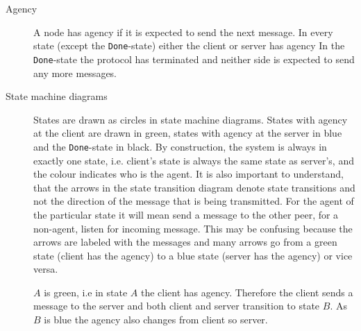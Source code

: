 \documentclass{report}
\newcommand{\state}[1]{\texttt{#1}}
\newcommand{\Done}{\state{Done}}
\theoremstyle{definition}{
  \newtheorem{lemma}{Lemma}[section] %
  \newtheorem{definition}[lemma]{Definition}
}
\theoremstyle{theorem}{
  \newtheorem{invariant}[lemma]{Invariant}
  \newtheorem{proofobligation}[lemma]{Proof Obligation}
}
\numberwithin{equation}{lemma}
\begin{document}
\begin{description}
\item[Agency]
  A node has agency if it is expected to send the next message.
  In every state (except the \Done-state) either the client or server has agency
  In the \Done-state the protocol has terminated and neither side is expected to send any more
  messages.

\item [State machine diagrams]
      States are drawn as circles in state machine diagrams.
      States with agency at the client are drawn in green, states with agency at the server in blue and
      the \Done-state in black.
      By construction, the system is always in exactly one state,
      i.e. client's state is always the same state as server's,
      and the colour indicates who is the agent.
      It is also important to understand, that the arrows in the state transition diagram denote
      state transitions and not the direction of the message that is being transmitted.
      For the agent of the particular state it will mean send a message to the
      other peer, for a non-agent, listen for incoming message.
      This may be confusing because the arrows are labeled with the messages and
      many arrows go from a green state (client has the agency) to a blue
      state (server has the agency) or vice versa.



      $A$ is green, i.e in state $A$ the client has agency.
      Therefore the client sends a message to the server and
      both client and server transition to state $B$.
      As $B$ is blue the agency also changes from client so server.



\end{description}
\end{document}
